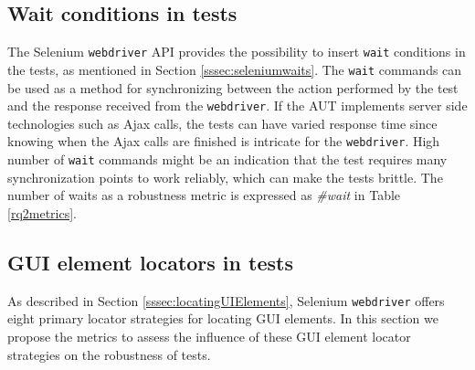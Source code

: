 \subsection{Wait conditions in tests}
\label{selenium-waits-metric}
The Selenium \texttt{webdriver} API provides the possibility to insert \texttt{wait} conditions in the tests, as mentioned in Section \ref{sssec:seleniumwaits}. The \texttt{wait} commands can be used as a method for synchronizing between the action performed by the test and the response received from the \texttt{webdriver}. If the AUT implements server side technologies such as Ajax calls, the tests can have varied response time since knowing when the Ajax calls are finished is intricate for the \texttt{webdriver}. High number of \texttt{wait} commands might be an indication that the test requires many synchronization points to work reliably, which can make the tests brittle. The number of waits as a robustness metric is expressed as \textit{\#wait} in Table \ref{rq2metrics}.

\subsection{GUI element locators in tests}
As described in Section \ref{sssec:locatingUIElements}, Selenium \texttt{webdriver} offers eight primary locator strategies for locating GUI elements. In this section we propose the metrics to assess the influence of these GUI element locator strategies on the robustness of tests.

